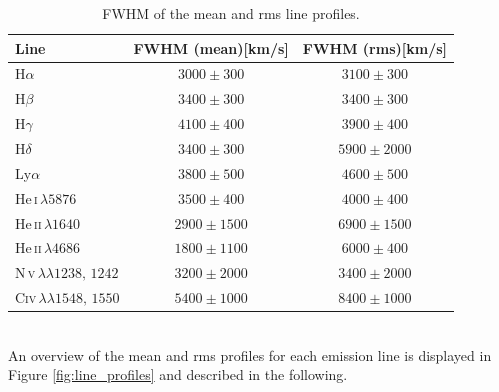\begin{table}[htbp]
	\centering
	\small
	\caption[Full Width Half Maxima]{FWHM of the mean and rms line profiles.}
	\label{tab:line_width_FWHM}
	\begin{tabular}{lcc}
		\hline
		\hline
		\textbf{Line} & FWHM (mean)[km/s] & FWHM (rms)[km/s]   \\
		\hline
		\hline
		H$\alpha$  & $3000 \pm 300$ &  $3100\pm 300$\\
		H$\beta$ & $3400 \pm 300$&  $3400 \pm 300$ \\
		H$\gamma$ & $4100 \pm 400$&  $3900 \pm 400$ \\
		H$\delta$ & $3400 \pm 300$&  $5900 \pm 2000$ \\
		Ly$\alpha$ & $3800 \pm 500$  &  $4600\pm 500$\\
		\hline
		He\,\textsc{i}$\,\lambda5876$ & $3500 \pm 400$&  $4000 \pm 400$  \\
		He\,\textsc{ii}$\,\lambda1640$  & $2900 \pm 1500$ & $6900 \pm 1500$\\
		He\,\textsc{ii}$\,\lambda4686$&  $1800 \pm 1100$&  $6000 \pm 400$ \\
		
		\hline
		N\,\textsc{v}$\,\lambda\lambda 1238,\,1242$ &  $3200 \pm 2000$&  $3400 \pm 2000$\\
		C\textsc{iv}$\,\lambda\lambda 1548,\,1550$ & $ 5400\pm 1000$  &  $ 8400 \pm 1000$\\
		
		\hline
		\hline
	\end{tabular}
\end{table}\\
An overview of the mean and rms profiles for each emission line is displayed in Figure \ref{fig:line_profiles} and described in the following.

